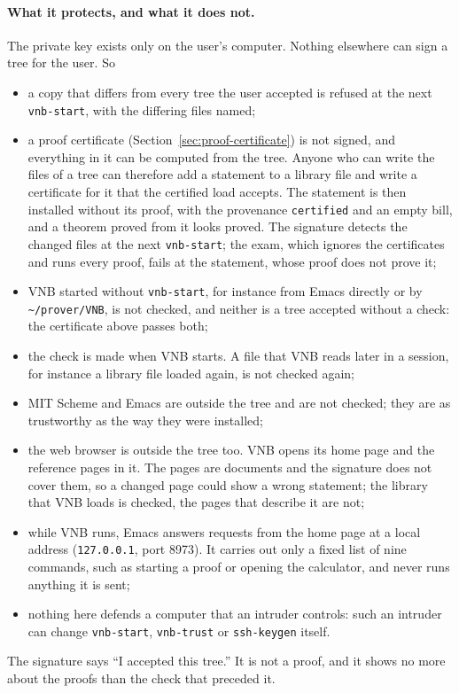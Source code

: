 \paragraph{What it protects, and what it does not.}  The private key
exists only on the user's computer.  Nothing elsewhere can sign a tree
for the user.  So
\begin{itemize}
\item a copy that differs from every tree the user accepted is refused
  at the next \texttt{vnb-start}, with the differing files named;
\item a proof certificate (Section~\ref{sec:proof-certificate}) is not
  signed, and everything in it can be computed from the tree.  Anyone
  who can write the files of a tree can therefore add a statement to a
  library file and write a certificate for it that the certified load
  accepts.  The statement is then installed without its proof, with the
  provenance \texttt{certified} and an empty bill, and a theorem proved
  from it looks proved.  The signature detects the changed files at the
  next \texttt{vnb-start}; the exam, which ignores the certificates and
  runs every proof, fails at the statement, whose proof does not
  prove it;
\item VNB started without \texttt{vnb-start}, for instance from Emacs
  directly or by \texttt{\textasciitilde/prover/VNB}, is not checked,
  and neither is a tree accepted without a check: the certificate above
  passes both;
\item the check is made when VNB starts.  A file that VNB reads later
  in a session, for instance a library file loaded again, is not
  checked again;
\item MIT Scheme and Emacs are outside the tree and are not checked;
  they are as trustworthy as the way they were installed;
\item the web browser is outside the tree too.  VNB opens its home page
  and the reference pages in it.  The pages are documents and the
  signature does not cover them, so a changed page could show a wrong
  statement; the library that VNB loads is checked, the pages that
  describe it are not;
\item while VNB runs, Emacs answers requests from the home page at a
  local address (\texttt{127.0.0.1}, port 8973).  It carries out only a
  fixed list of nine commands, such as starting a proof or opening the
  calculator, and never runs anything it is sent;
\item nothing here defends a computer that an intruder controls: such
  an intruder can change \texttt{vnb-start}, \texttt{vnb-trust} or
  \texttt{ssh-keygen} itself.
\end{itemize}
The signature says ``I accepted this tree.''  It is not a proof, and it
shows no more about the proofs than the check that preceded it.


